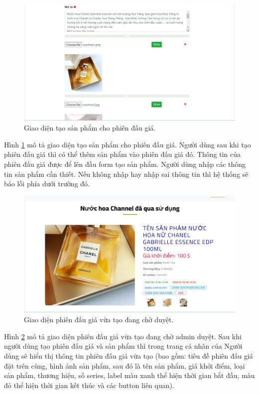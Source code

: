 \documentclass[../DoAn.tex]{subfiles}
\begin{document}
\begin{figure}[H]
    \centering
    \includegraphics[width=0.75\linewidth,height=6.21cm]{Hinhve/createitem2demo.png}
    \caption{Giao diện tạo sản phẩm cho phiên đấu giá.}
    \label{fig:Fig415}
\end{figure}
Hình \ref{fig:Fig415} mô tả giao diện tạo sản phẩm cho phiên đấu giá. Người dùng sau khi tạo phiên đấu giá thì có thể thêm sản phẩm vào phiên đấu giá đó. Thông tin của phiên đấu giá được để lên đầu form tạo sản phẩm. Người dùng nhập các thông tin sản phẩm cần thiết. Nếu không nhập hay nhập sai thông tin thì hệ thống sẽ báo lỗi phía dưới trường đó.
\begin{figure}[H]
    \centering
    \includegraphics[width=0.75\linewidth,height=6.21cm]{Hinhve/auctionwait.png}
    \caption{Giao diện phiên đấu giá vừa tạo đang chờ duyệt.}
    \label{fig:Fig416}
\end{figure}
Hình \ref{fig:Fig416} mô tả giao diện phiên đấu giá vừa tạo đang chờ admin duyệt. Sau khi người dùng tạo phiên đấu giá và sản phẩm thì trong trang cá nhân của Người dùng sẽ hiển thị thông tin phiên đấu giá vừa tạo (bao gồm: tiêu đề phiên đấu giá đặt trên cùng, hình ảnh sản phẩm, sau đó là tên sản phẩm, giá khởi điểm, loại sản phẩm, thương hiệu, số series, label màu xanh thể hiện thời gian bắt đầu, màu đỏ thể hiện thời gian kết thúc và các button liên quan).\\
\end{document}
